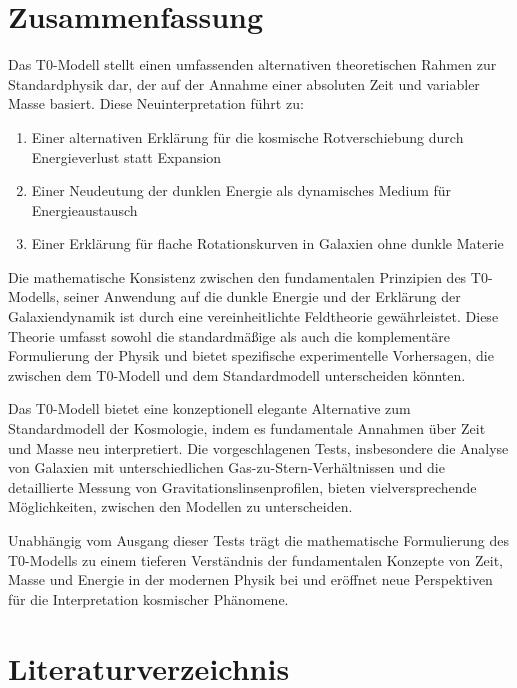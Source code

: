 \documentclass[a4paper,12pt]{article}
\begin{document}
	\section{Zusammenfassung}
	
	Das T0-Modell stellt einen umfassenden alternativen theoretischen Rahmen zur Standardphysik dar, der auf der Annahme einer absoluten Zeit und variabler Masse basiert. Diese Neuinterpretation führt zu:
	
	\begin{enumerate}
		\item Einer alternativen Erklärung für die kosmische Rotverschiebung durch Energieverlust statt Expansion
		\item Einer Neudeutung der dunklen Energie als dynamisches Medium für Energieaustausch
		\item Einer Erklärung für flache Rotationskurven in Galaxien ohne dunkle Materie
	\end{enumerate}
	
	Die mathematische Konsistenz zwischen den fundamentalen Prinzipien des T0-Modells, seiner Anwendung auf die dunkle Energie und der Erklärung der Galaxiendynamik ist durch eine vereinheitlichte Feldtheorie gewährleistet. Diese Theorie umfasst sowohl die standardmäßige als auch die komplementäre Formulierung der Physik und bietet spezifische experimentelle Vorhersagen, die zwischen dem T0-Modell und dem Standardmodell unterscheiden könnten.
	
	Das T0-Modell bietet eine konzeptionell elegante Alternative zum Standardmodell der Kosmologie, indem es fundamentale Annahmen über Zeit und Masse neu interpretiert. Die vorgeschlagenen Tests, insbesondere die Analyse von Galaxien mit unterschiedlichen Gas-zu-Stern-Verhältnissen und die detaillierte Messung von Gravitationslinsenprofilen, bieten vielversprechende Möglichkeiten, zwischen den Modellen zu unterscheiden.
	
	Unabhängig vom Ausgang dieser Tests trägt die mathematische Formulierung des T0-Modells zu einem tieferen Verständnis der fundamentalen Konzepte von Zeit, Masse und Energie in der modernen Physik bei und eröffnet neue Perspektiven für die Interpretation kosmischer Phänomene.
	
	\section{Literaturverzeichnis}
	
\end{document}
